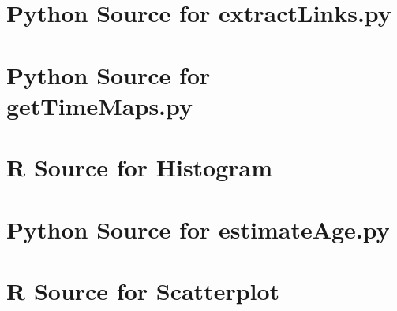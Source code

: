 \documentclass[letterpaper,11pt]{report}
\begin{document}



\appendix
{}

\chapter{Python Source for extractLinks.py} \label{chap:Python Source - Extract Links}

\chapter{Python Source for getTimeMaps.py} \label{chap:Python Source - Get TimeMaps}

\chapter{R Source for Histogram} \label{chap:R Source - Histogram}

\chapter{Python Source for estimateAge.py} \label{chap:Python Source - EstimateAge}

\chapter{R Source for Scatterplot} \label{chap:R Source - Scatterplot}

\end{document}
